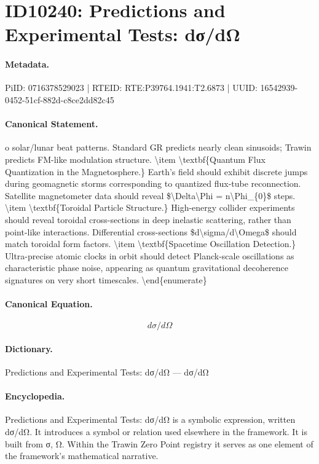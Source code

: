 \section*{ID10240: Predictions and Experimental Tests: dσ/dΩ}
\paragraph{Metadata.}
PiID: 0716378529023 | RTEID: RTE:P39764.1941:T2.6873 | UUID: 16542939-0452-51cf-882d-c8ce2dd82c45

\paragraph{Canonical Statement.}
o solar/lunar beat patterns. Standard GR predicts nearly clean sinusoids; Trawin predicts FM-like modulation structure. \textbackslash{}item \textbackslash{}textbf\{Quantum Flux Quantization in the Magnetosphere.\} Earth's field should exhibit discrete jumps during geomagnetic storms corresponding to quantized flux-tube reconnection. Satellite magnetometer data should reveal \$\textbackslash{}Delta\textbackslash{}Phi = n\textbackslash{}Phi\_\{0\}\$ steps. \textbackslash{}item \textbackslash{}textbf\{Toroidal Particle Structure.\} High-energy collider experiments should reveal toroidal cross-sections in deep inelastic scattering, rather than point-like interactions. Differential cross-sections \$d\textbackslash{}sigma/d\textbackslash{}Omega\$ should match toroidal form factors. \textbackslash{}item \textbackslash{}textbf\{Spacetime Oscillation Detection.\} Ultra-precise atomic clocks in orbit should detect Planck-scale oscillations as characteristic phase noise, appearing as quantum gravitational decoherence signatures on very short timescales. \textbackslash{}end\{enumerate\}

\paragraph{Canonical Equation.}
\[
d\sigma/d\Omega
\]

\paragraph{Dictionary.}
Predictions and Experimental Tests: dσ/dΩ — dσ/dΩ

\paragraph{Encyclopedia.}
Predictions and Experimental Tests: dσ/dΩ is a symbolic expression, written dσ/dΩ. It introduces a symbol or relation used elsewhere in the framework. It is built from σ, Ω. Within the Trawin Zero Point registry it serves as one element of the framework's mathematical narrative.
